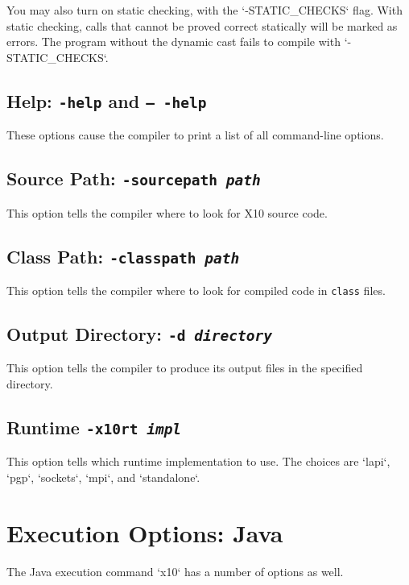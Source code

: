 You may also turn on static checking, with the \xcd`-STATIC_CHECKS` flag.  With
static checking, calls that cannot be proved correct statically will be
marked as errors.  The program without the dynamic cast fails to compile with
\xcd`-STATIC_CHECKS`.  





\subsection{Help: {\tt -help} and {\tt -- -help}}

These options cause the compiler to print a list of all command-line options.


\subsection{Source Path: {\tt -sourcepath {\em path}}}

This option tells the compiler where to look for X10 source code.  


\subsection{Class Path: {\tt -classpath {\em path}}}

This option tells the compiler where to look for compiled code in {\tt class}
files.

\subsection{Output Directory: {\tt -d {\em directory}}}

This option tells the compiler to produce its output files in the specified directory.

\subsection{Runtime {\tt -x10rt {\em impl}}}

This option tells which runtime implementation to use.  The choices are
\xcd`lapi`, \xcd`pgp`, \xcd`sockets`, \xcd`mpi`, and \xcd`standalone`.



\section{Execution Options: Java}

The Java execution command \xcd`x10` has a number of options as well. 

